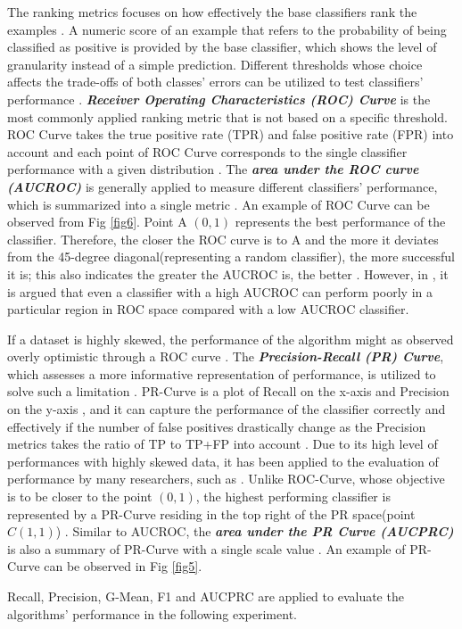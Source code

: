 The ranking metrics focuses on how effectively the base classifiers rank the examples \cite{45}. A numeric score of an example that refers to the probability of being classified as positive is provided by the base classifier, which shows the level of granularity instead of a simple prediction. Different thresholds whose choice affects the trade-offs of both classes' errors can be utilized to test classifiers' performance \cite{10}. \textbf{\textit{Receiver Operating Characteristics (ROC) Curve}} \cite{53} is the most commonly applied ranking metric that is not based on a specific threshold. ROC Curve takes the true positive rate (TPR) and false positive rate (FPR) into account and each point of ROC Curve corresponds to the single classifier performance with a given distribution \cite{17}. The \textbf{\textit{area under the ROC curve (AUCROC)}} is generally applied to measure different classifiers' performance, which is summarized into a single metric \cite{48}. An example of ROC Curve can be observed from Fig \ref{fig6}. Point A $(0,1)$ represents the best performance of the classifier. Therefore, the closer the ROC curve is to A and the more it deviates from the 45-degree diagonal(representing a random classifier), the more successful it is; this also indicates the greater the AUCROC is, the better \cite{53,48}. However, in \cite{17}, it is argued that even a classifier with a high AUCROC can perform poorly in a particular region in ROC space compared with a low AUCROC classifier.

If a dataset is highly skewed, the performance of the algorithm might as observed overly optimistic through a ROC curve \cite{111}. The \textbf{\textit{Precision-Recall (PR) Curve}}, which assesses a more informative representation of performance, is utilized to solve such a limitation \cite{17,54}. PR-Curve is a plot of Recall on the x-axis and Precision on the y-axis \cite{54}, and it can capture the performance of the classifier correctly and effectively if the number of false positives drastically change as the Precision metrics takes the ratio of TP to TP+FP into account \cite{17}. Due to its high level of performances with highly skewed data, it has been applied to the evaluation of performance by many researchers, such as \cite{55,56,57}. Unlike ROC-Curve, whose objective is to be closer to the point $(0,1)$, the highest performing classifier is represented by a PR-Curve residing in the top right of the PR space(point $C(1,1)$) \cite{10}. Similar to AUCROC, the \textbf{\textit{area under the PR Curve (AUCPRC)}} is also a summary of PR-Curve with a single scale value \cite{10}. An example of PR-Curve can be observed in Fig \ref{fig5}.

Recall, Precision, G-Mean, F1 and AUCPRC are applied to evaluate the algorithms' performance in the following experiment.